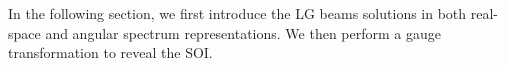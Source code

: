 In the following section, we first introduce the LG beams solutions in both real-space and angular spectrum representations. We then perform a gauge transformation to reveal the SOI.

